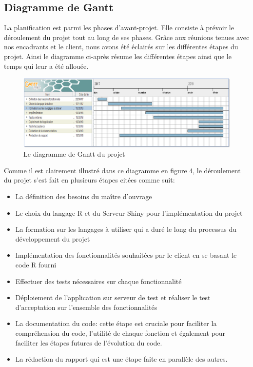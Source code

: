 	\subsection{Diagramme de Gantt}
	La planification est parmi les phases d’avant-projet. Elle consiste à prévoir le déroulement du projet tout au long de ses phases. Grâce aux réunions tenues avec nos encadrants et le client, nous avons été éclairés sur les différentes étapes du projet.
	Ainsi le diagramme ci-après résume les différentes étapes ainsi que le temps qui leur a été allouée.
	\newpage
\begin{figure}
	   \center
	   \includegraphics[scale=0.9]{img/diagramme_de_gantt.png}
	   \caption {Le diagramme de Gantt du projet}	
\end{figure}
	\newpage
   Comme il est clairement illustré dans ce diagramme en figure 4, le déroulement du projet s'est fait en plusieurs étapes citées comme suit:
 \begin{itemize}
\item La définition des besoins du maître d'ouvrage
\item Le choix du langage R et du Serveur Shiny pour l'implémentation du projet
\item La formation sur les langages à utiliser qui a duré le long du processus du développement du projet
\item Implémentation des fonctionnalités souhaitées par le client en se basant le code R fourni
\item Effectuer des tests nécessaires sur chaque fonctionnalité
\item Déploiement de l'application sur serveur de test et réaliser le test d'acceptation sur l'ensemble des fonctionnalités
\item La documentation du code: cette étape est cruciale pour faciliter la compréhension du code, l'utilité de chaque fonction et également pour faciliter les étapes futures  de l'évolution du code.
\item La rédaction du rapport qui est une étape faite en parallèle des autres.
 \end{itemize}